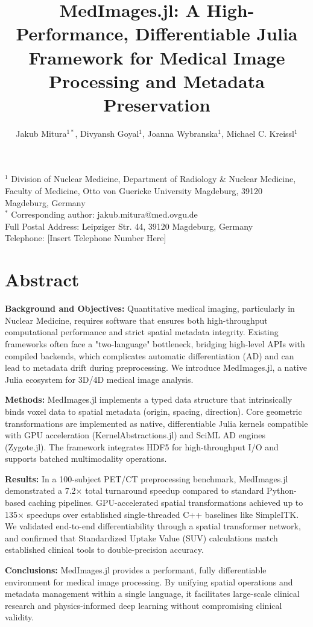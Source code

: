 \documentclass[10pt,letterpaper]{article}
\title{MedImages.jl: A High-Performance, Differentiable Julia Framework for Medical Image Processing and Metadata Preservation}
\author{Jakub Mitura$^{1*}$, Divyansh Goyal$^{1}$, Joanna Wybranska$^{1}$, Michael C. Kreissl$^{1}$}
\date{}
\begin{document}
\maketitle

\noindent
$^{1}$ Division of Nuclear Medicine, Department of Radiology \& Nuclear Medicine, Faculty of Medicine, Otto von Guericke University Magdeburg, 39120 Magdeburg, Germany \\
$^{*}$ Corresponding author: jakub.mitura@med.ovgu.de \\
Full Postal Address: Leipziger Str. 44, 39120 Magdeburg, Germany \\
Telephone: [Insert Telephone Number Here]

\section*{Abstract}
\textbf{Background and Objectives:} Quantitative medical imaging, particularly in Nuclear Medicine, requires software that ensures both high-throughput computational performance and strict spatial metadata integrity. Existing frameworks often face a "two-language" bottleneck, bridging high-level APIs with compiled backends, which complicates automatic differentiation (AD) and can lead to metadata drift during preprocessing. We introduce MedImages.jl, a native Julia ecosystem for 3D/4D medical image analysis.

\textbf{Methods:} MedImages.jl implements a typed data structure that intrinsically binds voxel data to spatial metadata (origin, spacing, direction). Core geometric transformations are implemented as native, differentiable Julia kernels compatible with GPU acceleration (KernelAbstractions.jl) and SciML AD engines (Zygote.jl). The framework integrates HDF5 for high-throughput I/O and supports batched multimodality operations.

\textbf{Results:} In a 100-subject PET/CT preprocessing benchmark, MedImages.jl demonstrated a 7.2$\times$ total turnaround speedup compared to standard Python-based caching pipelines. GPU-accelerated spatial transformations achieved up to 135$\times$ speedups over established single-threaded C++ baselines like SimpleITK. We validated end-to-end differentiability through a spatial transformer network, and confirmed that Standardized Uptake Value (SUV) calculations match established clinical tools to double-precision accuracy.

\textbf{Conclusions:} MedImages.jl provides a performant, fully differentiable environment for medical image processing. By unifying spatial operations and metadata management within a single language, it facilitates large-scale clinical research and physics-informed deep learning without compromising clinical validity.
\end{document}
